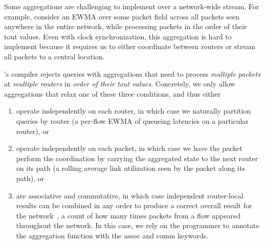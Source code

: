 Some aggregations are challenging to implement over a network-wide stream. For
example, consider an EWMA over some packet field across all packets seen
anywhere in the entire network, while processing packets in the order of their
{\ct tout} values. Even with clock synchronization, this aggregation is hard to
implement because it requires us to either coordinate between routers or
stream all packets to a central location.

\TheSystem's compiler rejects queries with aggregations that need to process
{\em multiple packets} at {\em multiple routers} in {\em order of their {\ct tout}
values}. Concretely, we only allow aggregations that relax one of these three
conditions, and thus either
\begin{enumerate}
\item operate independently on each router, in which case we naturally
  partition queries by router (\eg a per-flow EWMA of queueing latencies on a
  particular router), or
\item operate independently on each packet, in which case we have the packet
  perform the coordination by carrying the aggregated state to the next router on
  its path (\eg a rolling average link utilization seen by the packet
  along its path), or
\item are associative and commutative, in which case independent router-local results can be
  combined in any order to produce a correct overall result for the network~\cite{theory-tr},
  \eg a count of how many times packets from a flow
  appeared throughout the network. In this case, we rely on the
  programmer to annotate the aggregation function with the
  {\ct assoc} and {\ct comm} keywords.
\end{enumerate}
